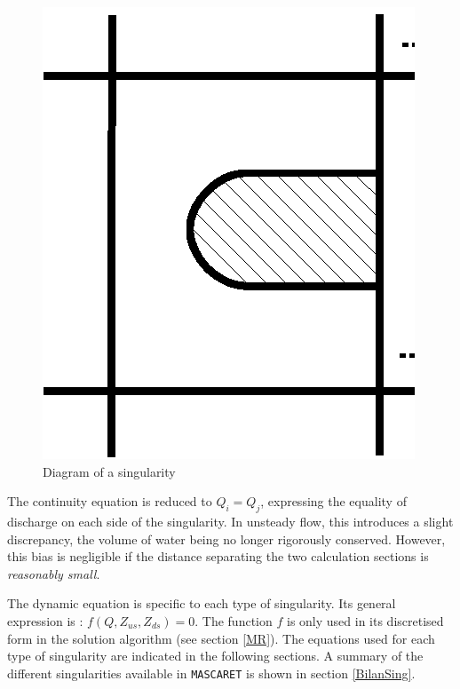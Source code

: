 \begin{figure}
 \begin{center}
  \includegraphics[scale=0.8,angle=270]{Figures/Schema_singularite.eps}
  \vspace{0.5cm}
  \caption{Diagram of a singularity}
  \label{SchemSing}
 \end{center}
\end{figure}

\vspace{0.5cm}

The continuity equation is reduced to $Q_i = Q_j$, expressing the equality of discharge on each side of the singularity. In unsteady flow, this introduces a slight discrepancy, the volume of water being no longer rigorously conserved. However, this bias is negligible if the distance separating the two calculation sections is \textit{reasonably small}.

\vspace{0.5cm}

The dynamic equation is specific to each type of singularity. Its general expression is : $f(Q, Z_{us},Z_{ds}) = 0$. 
The function $f$ is only used in its discretised form in the solution algorithm (see section \ref{MR}).
The equations used for each type of singularity are indicated in the following sections. A summary of the different singularities available in \texttt{MASCARET} is shown in section \ref{BilanSing}.

